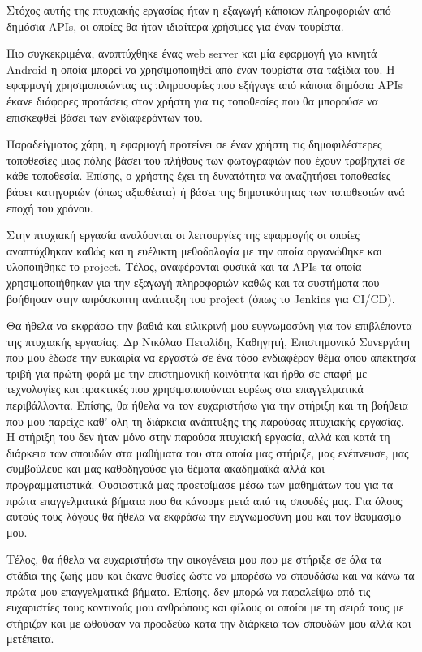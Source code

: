 \documentclass[oneside, 12pt]{book}
\begin{document}
\Titlepage
\Declarationpage
\begin{Abstract}
Στόχος αυτής της πτυχιακής εργασίας ήταν η εξαγωγή κάποιων πληροφοριών από δημόσια APIs, οι οποίες θα ήταν ιδιαίτερα χρήσιμες για έναν τουρίστα. 

Πιο συγκεκριμένα, αναπτύχθηκε ένας web server και μία εφαρμογή για κινητά Android η οποία μπορεί να χρησιμοποιηθεί από έναν τουρίστα στα ταξίδια του. Η εφαρμογή χρησιμοποιώντας τις πληροφορίες που εξήγαγε από κάποια δημόσια APIs έκανε διάφορες προτάσεις στον χρήστη για τις τοποθεσίες που θα μπορούσε να επισκεφθεί βάσει των ενδιαφερόντων του.

Παραδείγματος χάρη, η εφαρμογή προτείνει σε έναν χρήστη τις δημοφιλέστερες τοποθεσίες μιας πόλης βάσει του πλήθους των φωτογραφιών που έχουν τραβηχτεί σε κάθε τοποθεσία. Επίσης, ο χρήστης έχει τη δυνατότητα να αναζητήσει τοποθεσίες βάσει κατηγοριών (όπως αξιοθέατα) ή βάσει της δημοτικότητας των τοποθεσιών ανά εποχή του χρόνου.

Στην πτυχιακή εργασία αναλύονται οι λειτουργίες της εφαρμογής οι οποίες αναπτύχθηκαν καθώς και η ευέλικτη μεθοδολογία με την οποία οργανώθηκε και υλοποιήθηκε το project. Τέλος, αναφέρονται φυσικά και τα APIs τα οποία χρησιμοποιήθηκαν για την εξαγωγή πληροφοριών καθώς και τα συστήματα που βοήθησαν στην απρόσκοπτη ανάπτυξη του project (όπως το Jenkins για CI/CD).
\end{Abstract}
\tableofcontents

\listoftables
\listoffigures

\begin{Acknowledgement}
Θα ήθελα να εκφράσω την βαθιά και ειλικρινή μου ευγνωμοσύνη για τον επιβλέποντα της πτυχιακής εργασίας, Δρ Νικόλαο Πεταλίδη, Καθηγητή, Επιστημονικό Συνεργάτη που μου έδωσε την ευκαιρία να εργαστώ σε ένα τόσο ενδιαφέρον θέμα όπου απέκτησα τριβή για πρώτη φορά με την επιστημονική κοινότητα και ήρθα σε επαφή  με τεχνολογίες και πρακτικές που χρησιμοποιούνται ευρέως στα επαγγελματικά περιβάλλοντα. Επίσης, θα ήθελα να τον ευχαριστήσω για την στήριξη και τη βοήθεια που μου παρείχε καθ' όλη τη διάρκεια ανάπτυξης της παρούσας πτυχιακής εργασίας. Η στήριξη του δεν ήταν μόνο στην παρούσα πτυχιακή εργασία, αλλά και κατά τη διάρκεια των σπουδών στα μαθήματα του στα οποία μας στήριζε, μας ενέπνευσε, μας συμβούλευε και μας καθοδηγούσε για θέματα ακαδημαϊκά αλλά και προγραμματιστικά. Ουσιαστικά μας προετοίμασε μέσω των μαθημάτων του για τα πρώτα επαγγελματικά βήματα που θα κάνουμε μετά από τις σπουδές μας. Για όλους αυτούς τους λόγους θα ήθελα να εκφράσω την ευγνωμοσύνη μου και τον θαυμασμό μου.

Τέλος, θα ήθελα να ευχαριστήσω την οικογένεια μου που με στήριξε σε όλα τα στάδια της ζωής μου και έκανε θυσίες ώστε να μπορέσω να σπουδάσω και να κάνω τα πρώτα μου επαγγελματικά βήματα. Επίσης, δεν μπορώ να παραλείψω από τις ευχαριστίες τους κοντινούς μου ανθρώπους και φίλους οι οποίοι με τη σειρά τους με στήριζαν και με ωθούσαν να προοδεύω κατά την διάρκεια των σπουδών μου αλλά και μετέπειτα.
\end{Acknowledgement}
\end{document}
